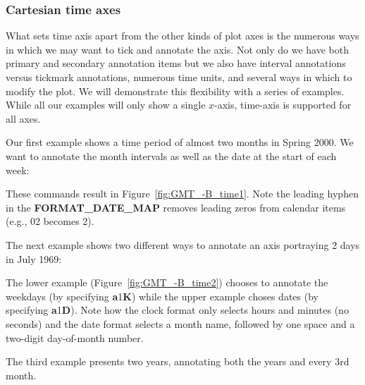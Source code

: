
\subsubsection{Cartesian time axes}

What sets time axis apart from the other kinds of plot axes is the numerous ways in which we
may want to tick and annotate the axis.  Not only do we have both primary and secondary annotation
items but we also have interval annotations versus tickmark annotations, numerous time units,
and several ways in which to modify the plot.  We will demonstrate this flexibility with a
series of examples.  While all our examples will only show a single $x$-axis, time-axis is supported for all axes.

Our first example shows a time period of almost two months in Spring 2000.  We want to annotate the month
intervals as well as the date at the start of each week:


These commands result in Figure~\ref{fig:GMT_-B_time1}.  Note the leading hyphen in the \textbf{FORMAT\_DATE\_MAP}
removes leading zeros from calendar items (e.g., 02 becomes 2).

The next example shows two different ways to annotate an axis portraying 2 days in July 1969:


The lower example (Figure~\ref{fig:GMT_-B_time2}) chooses to annotate the weekdays (by specifying
\textbf{a}1\textbf{K}) while the upper
example choses dates (by specifying \textbf{a}1\textbf{D}).  Note how the clock format only selects hours and minutes (no seconds) and
the date format selects a month name, followed by one space and a two-digit day-of-month number.


The third example presents two years, annotating both the years and every 3rd month.

